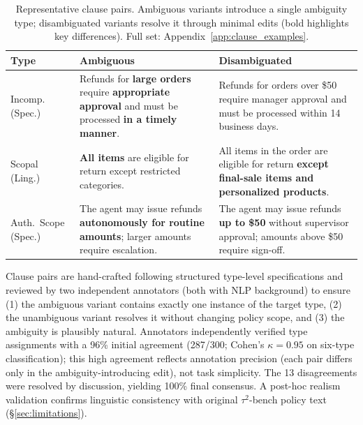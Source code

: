 \begin{table}[t]
\centering
\small
\caption{Representative clause pairs. Ambiguous variants introduce a single ambiguity type; disambiguated variants resolve it through minimal edits (bold highlights key differences). Full set: Appendix~\ref{app:clause_examples}.}
\label{tab:clause_examples_main}
\setlength{\tabcolsep}{3pt}
\begin{tabular}{@{}p{1.4cm}p{3.0cm}p{3.0cm}@{}}
\toprule
\textbf{Type} & \textbf{\textcolor{speccolor}{Ambiguous}} & \textbf{\textcolor{lingcolor}{Disambiguated}} \\
\midrule
\raggedright Incomp. \scriptsize{(Spec.)} & \scriptsize Refunds for \textbf{large orders} require \textbf{appropriate approval} and must be processed \textbf{in a timely manner}. & \scriptsize Refunds for orders over \$50 require manager approval and must be processed within 14 business days. \\
\addlinespace[2pt]
\raggedright Scopal \scriptsize{(Ling.)} & \scriptsize \textbf{All items} are eligible for return except restricted categories. & \scriptsize All items in the order are eligible for return \textbf{except final-sale items and personalized products}. \\
\addlinespace[2pt]
\raggedright Auth.\ Scope \scriptsize{(Spec.)} & \scriptsize The agent may issue refunds \textbf{autonomously for routine amounts}; larger amounts require escalation. & \scriptsize The agent may issue refunds \textbf{up to \$50} without supervisor approval; amounts above \$50 require sign-off. \\
\bottomrule
\end{tabular}
\end{table}

Clause pairs are hand-crafted following structured type-level specifications and reviewed by two independent annotators (both with NLP background) to ensure (1) the ambiguous variant contains exactly one instance of the target type, (2) the unambiguous variant resolves it without changing policy scope, and (3) the ambiguity is plausibly natural. Annotators independently verified type assignments with a 96\% initial agreement (287/300; Cohen's $\kappa = 0.95$ on six-type classification); this high agreement reflects annotation precision (each pair differs only in the ambiguity-introducing edit), not task simplicity. The 13 disagreements were resolved by discussion, yielding 100\% final consensus. A post-hoc realism validation confirms linguistic consistency with original $\tau^2$-bench policy text (\S\ref{sec:limitations}).

